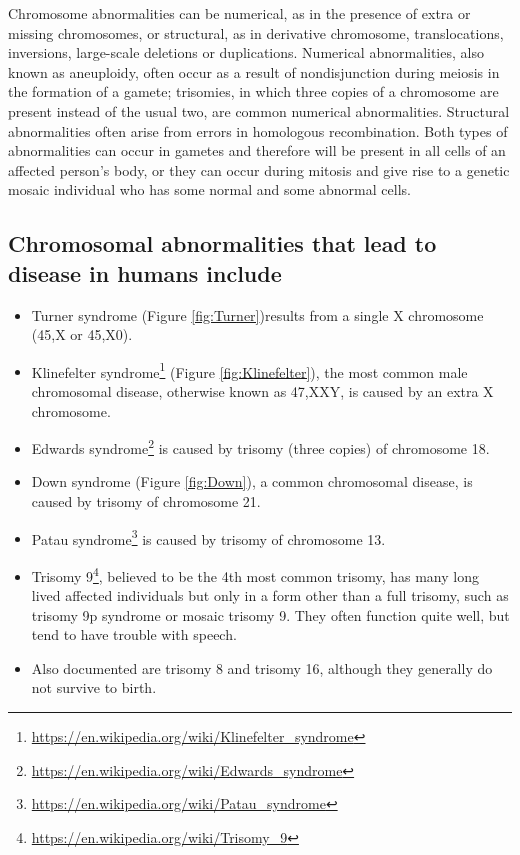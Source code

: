 \documentclass[]{book}
\providecommand{\tightlist}{%
  \setlength{\itemsep}{0pt}\setlength{\parskip}{0pt}}
\let\rmarkdownfootnote\footnote%
\def\footnote{\protect\rmarkdownfootnote}
\renewcommand{\href}[2]{#2\footnote{\url{#1}}}
\theoremstyle{definition}
\theoremstyle{definition}
\theoremstyle{definition}
\theoremstyle{remark}
\begin{document}
Chromosome abnormalities can be numerical, as in the presence of extra
or missing chromosomes, or structural, as in derivative chromosome,
translocations, inversions, large-scale deletions or duplications.
Numerical abnormalities, also known as aneuploidy, often occur as a
result of nondisjunction during meiosis in the formation of a gamete;
trisomies, in which three copies of a chromosome are present instead of
the usual two, are common numerical abnormalities. Structural
abnormalities often arise from errors in homologous recombination. Both
types of abnormalities can occur in gametes and therefore will be
present in all cells of an affected person's body, or they can occur
during mitosis and give rise to a genetic mosaic individual who has some
normal and some abnormal cells.

\subsection{Chromosomal abnormalities that lead to disease in humans
include}\label{chromosomal-abnormalities-that-lead-to-disease-in-humans-include}

\begin{itemize}
\tightlist
\item
  Turner syndrome (Figure \ref{fig:Turner})results from a single X
  chromosome (45,X or 45,X0).
\item
  \href{https://en.wikipedia.org/wiki/Klinefelter_syndrome}{Klinefelter
  syndrome} (Figure \ref{fig:Klinefelter}), the most common male
  chromosomal disease, otherwise known as 47,XXY, is caused by an extra
  X chromosome.
\item
  \href{https://en.wikipedia.org/wiki/Edwards_syndrome}{Edwards
  syndrome} is caused by trisomy (three copies) of chromosome 18.
\item
  Down syndrome (Figure \ref{fig:Down}), a common chromosomal disease,
  is caused by trisomy of chromosome 21.
\item
  \href{https://en.wikipedia.org/wiki/Patau_syndrome}{Patau syndrome} is
  caused by trisomy of chromosome 13.
\item
  \href{https://en.wikipedia.org/wiki/Trisomy_9}{Trisomy 9}, believed to
  be the 4th most common trisomy, has many long lived affected
  individuals but only in a form other than a full trisomy, such as
  trisomy 9p syndrome or mosaic trisomy 9. They often function quite
  well, but tend to have trouble with speech.
\item
  Also documented are trisomy 8 and trisomy 16, although they generally
  do not survive to birth.
\end{itemize}
\end{document}
